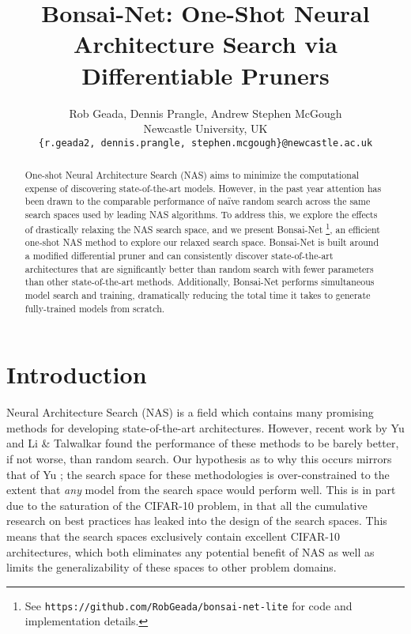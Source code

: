 \documentclass[10pt,twocolumn,letterpaper]{article}
\begin{document}
\title{Bonsai-Net: One-Shot Neural Architecture Search via Differentiable Pruners}

\author{Rob Geada, Dennis Prangle, Andrew Stephen McGough  \\
Newcastle University, UK\\
{\tt\small \{r.geada2, dennis.prangle, stephen.mcgough\}@newcastle.ac.uk} \\ \and 
}

\maketitle


\begin{abstract}
	One-shot Neural Architecture Search (NAS) aims to minimize the computational expense of  discovering state-of-the-art models. However, in the past year attention has been drawn to the comparable performance of na{\"i}ve random search across the same search spaces used by leading NAS algorithms. To address this, we explore the effects of drastically relaxing the NAS search space, and we present Bonsai-Net \footnote{See \texttt{https://github.com/RobGeada/bonsai-net-lite} for code and implementation details.}, an efficient one-shot NAS method to explore our relaxed search space. Bonsai-Net is built around a modified differential pruner and can consistently discover state-of-the-art architectures that are significantly better than random search with fewer parameters than other state-of-the-art methods.  Additionally, Bonsai-Net performs simultaneous model search and training, dramatically reducing the total time it takes to generate fully-trained models from scratch.
\end{abstract}
\section{Introduction}
Neural Architecture Search (NAS) is a field which contains many promising methods for developing state-of-the-art architectures. However, recent work by Yu \etal \cite{yu2019} and Li \& Talwalkar \cite{li2019} found the performance of these methods to be barely better, if not worse, than random search. Our hypothesis as to why this occurs mirrors that of Yu \etal; the search space for these methodologies is over-constrained to the extent that \textit{any} model from the search space would perform well. This is in part due to the saturation of the CIFAR-10 problem, in that all the cumulative research on best practices has leaked into the design of the search spaces. This means that the search spaces exclusively contain excellent CIFAR-10 architectures, which both eliminates any potential benefit of NAS as well as limits the generalizability of these spaces to other problem domains. 
\end{document}
